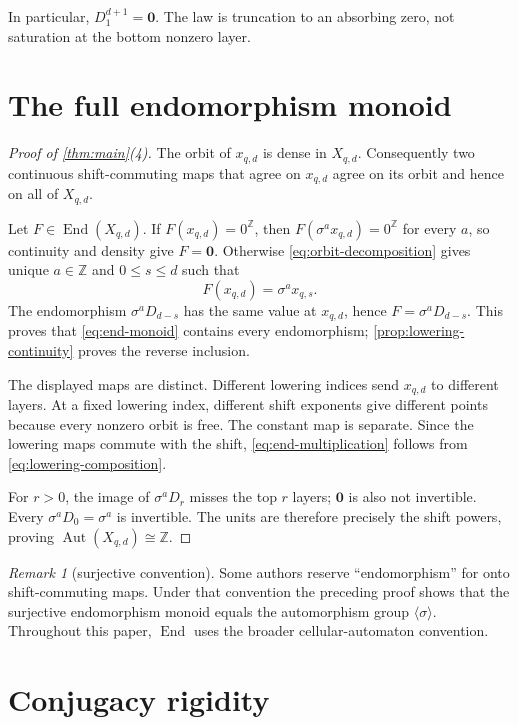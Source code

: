 \documentclass[11pt,a4paper]{amsart}
\theoremstyle{definition}
\theoremstyle{remark}
\newtheorem{remark}[theorem]{Remark}
\newcommand{\Z}{\mathbb Z}
\newcommand{\End}{\operatorname{End}}
\newcommand{\Aut}{\operatorname{Aut}}
\newcommand{\zz}{\mathbf 0}
\newcommand{\zero}{0^{\Z}}
\begin{document}
In particular, $D_1^{d+1}=\zz$.  The law is truncation to an absorbing zero,
not saturation at the bottom nonzero layer.

\section{The full endomorphism monoid}

\begin{proof}[Proof of \cref{thm:main}(4)]
The orbit of $x_{q,d}$ is dense in $X_{q,d}$.  Consequently two continuous
shift-commuting maps that agree on $x_{q,d}$ agree on its orbit and hence on
all of $X_{q,d}$.

Let $F\in\End(X_{q,d})$.  If $F(x_{q,d})=\zero$, then
$F(\sigma^a x_{q,d})=\zero$ for every $a$, so continuity and density give
$F=\zz$.  Otherwise \eqref{eq:orbit-decomposition} gives unique
$a\in\Z$ and $0\leq s\leq d$ such that
\[
 F(x_{q,d})=\sigma^a x_{q,s}.
\]
The endomorphism $\sigma^aD_{d-s}$ has the same value at $x_{q,d}$, hence
$F=\sigma^aD_{d-s}$.  This proves that \eqref{eq:end-monoid} contains every
endomorphism; \cref{prop:lowering-continuity} proves the reverse inclusion.

The displayed maps are distinct.  Different lowering indices send
$x_{q,d}$ to different layers.  At a fixed lowering index, different shift
exponents give different points because every nonzero orbit is free.  The
constant map is separate.  Since the lowering maps commute with the shift,
\eqref{eq:end-multiplication} follows from
\eqref{eq:lowering-composition}.

For $r>0$, the image of $\sigma^aD_r$ misses the top $r$ layers; $\zz$ is
also not invertible.  Every $\sigma^aD_0=\sigma^a$ is invertible.  The units
are therefore precisely the shift powers, proving
$\Aut(X_{q,d})\cong\Z$.
\end{proof}

\begin{remark}[surjective convention]
Some authors reserve ``endomorphism'' for onto shift-commuting maps.  Under
that convention the preceding proof shows that the surjective endomorphism
monoid equals the automorphism group $\langle\sigma\rangle$.  Throughout this
paper, $\End$ uses the broader cellular-automaton convention.
\end{remark}

\section{Conjugacy rigidity}
\end{document}
